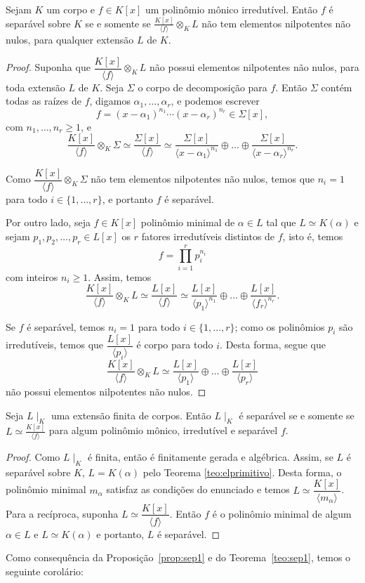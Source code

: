 \begin{prop} \label{prop:sep1}
Sejam $K$ um corpo e $f \in K[x]$ um polinômio mônico irredutível. Então $f$ é separável sobre $K$ se e somente se $\displaystyle\frac{K[x]}{\langle f \rangle}\otimes_K L$ não tem elementos nilpotentes não nulos, para qualquer extensão $L$ de $K$.
\begin{proof}
Suponha que $\dfrac{K[x]}{\langle f \rangle}\otimes_K L$ não possui elementos nilpotentes não nulos, para toda extensão $L$ de $K$. Seja $\Sigma$ o corpo de decomposição para $f$. Então $\Sigma$ contém todas as raízes de $f$, digamos $\alpha_1, \dots, \alpha_r$, e podemos escrever \[f=(x-\alpha_1)^{n_1}\cdots(x-\alpha_r)^{n_r} \in \Sigma[x],\] com $n_1, \dots, n_r \geq 1$, e \[\dfrac{K[x]}{\langle f \rangle} \otimes_K  \Sigma \simeq \dfrac{\Sigma[x]}{\langle f \rangle} \simeq \dfrac{\Sigma[x]}{\langle x-\alpha_1 \rangle^{n_1}} \oplus \dots \oplus \dfrac{\Sigma[x]}{\langle x-\alpha_r \rangle^{n_r}}.\]

Como $\dfrac{K[x]}{\langle f \rangle} \otimes_K \Sigma$ não tem elementos nilpotentes não nulos, temos que $n_i = 1$ para todo $i \in \{1, \dots, r\}$, e portanto $f$ é separável.

Por outro lado, seja $f \in K[x]$ polinômio minimal de $\alpha \in L$ tal que $L\simeq K(\alpha)$ e sejam $p_1, p_2, \dots, p_r \in L[x]$ os $r$ fatores irredutíveis distintos de $f$, isto é, temos \[f = \prod_{i = 1}^{r} p_i ^{n_i}\] com inteiros $n_i \geq 1$. Assim, temos
\[\dfrac{K[x]}{\langle f \rangle}\otimes_K L \simeq \dfrac{L[x]}{\langle f \rangle} \simeq \dfrac{L[x]}{\langle p_1 \rangle^{n_1}} \oplus \dots \oplus \dfrac{L[x]}{\langle f_r \rangle^{n_r}}.\]

Se $f$ é separável, temos $n_i = 1$ para todo $i\in\{1,\dots, r\}$; como os polinômios $p_i$ são irredutíveis, temos que $\dfrac{L[x]}{\langle p_i \rangle}$ é corpo para todo $i$. Desta forma, segue que \[\dfrac{K[x]}{\langle f \rangle}\otimes_K L \simeq \dfrac{L[x]}{\langle p_1 \rangle} \oplus \dots \oplus \dfrac{L[x]}{\langle p_r \rangle}\] não possui elementos nilpotentes não nulos.
\end{proof}
\end{prop}

\begin{teo} \label{teo:sep1}
Seja $L\mid_K$ uma extensão finita de corpos. Então $L\mid_K$ é separável se e somente se $L\simeq \displaystyle\frac{K[x]}{\langle f\rangle }$ para algum polinômio mônico, irredutível e separável $f$.
\begin{proof}
Como $L\mid_K$ é finita, então é finitamente gerada e algébrica. Assim, se $L$ é separável sobre $K$, $L = K(\alpha)$ pelo Teorema \ref{teo:elprimitivo}. Desta forma, o polinômio minimal $m_\alpha$ satisfaz as condições do enunciado e temos $L \simeq \dfrac{K[x]}{\langle m_\alpha \rangle}$. Para a recíproca, suponha $L\simeq \dfrac{K[x]}{\langle f \rangle}$. Então $f$ é o polinômio minimal de algum $\alpha \in L$ e $L\simeq K(\alpha)$ e portanto, $L$ é separável.
\end{proof}
\end{teo}
Como consequência  da Proposição~\ref{prop:sep1} e do Teorema~\ref{teo:sep1}, temos o seguinte corolário:

